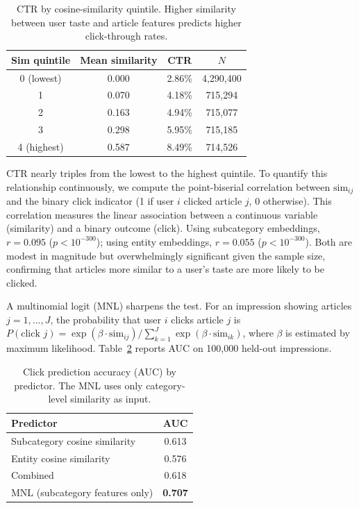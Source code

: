 \documentclass[11pt]{article}
\begin{document}
\begin{table}[ht]
\centering
\caption{CTR by cosine-similarity quintile. Higher similarity between user taste and article features predicts higher click-through rates.}
\label{tab:sim_quintile}
\begin{tabular}{cccc}
\toprule
Sim quintile & Mean similarity & CTR & $N$ \\
\midrule
0 (lowest) & 0.000 & 2.86\% & 4,290,400 \\
1 & 0.070 & 4.18\% & 715,294 \\
2 & 0.163 & 4.94\% & 715,077 \\
3 & 0.298 & 5.95\% & 715,185 \\
4 (highest) & 0.587 & 8.49\% & 714,526 \\
\bottomrule
\end{tabular}
\end{table}
\FloatBarrier

CTR nearly triples from the lowest to the highest quintile. To quantify this relationship continuously, we compute the point-biserial correlation between $\text{sim}_{ij}$ and the binary click indicator (1 if user $i$ clicked article $j$, 0 otherwise). This correlation measures the linear association between a continuous variable (similarity) and a binary outcome (click). Using subcategory embeddings, $r = 0.095$ ($p < 10^{-300}$); using entity embeddings, $r = 0.055$ ($p < 10^{-300}$). Both are modest in magnitude but overwhelmingly significant given the sample size, confirming that articles more similar to a user's taste are more likely to be clicked.

A multinomial logit (MNL) sharpens the test. For an impression showing articles $j = 1, \ldots, J$, the probability that user $i$ clicks article $j$ is $P(\text{click } j) = \exp(\beta \cdot \text{sim}_{ij}) / \sum_{k=1}^{J} \exp(\beta \cdot \text{sim}_{ik})$, where $\beta$ is estimated by maximum likelihood. Table~\ref{tab:auc} reports AUC on 100,000 held-out impressions.

\begin{table}[ht]
\centering
\caption{Click prediction accuracy (AUC) by predictor. The MNL uses only category-level similarity as input.}
\label{tab:auc}
\begin{tabular}{lc}
\toprule
Predictor & AUC \\
\midrule
Subcategory cosine similarity & 0.613 \\
Entity cosine similarity & 0.576 \\
Combined & 0.618 \\
MNL (subcategory features only) & \textbf{0.707} \\
\bottomrule
\end{tabular}
\end{table}
\FloatBarrier
\end{document}
